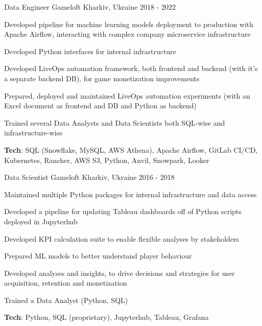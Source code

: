 \begin{cventries}
  \cventry
    {Data Engineer} %
    {Gameloft} %
    {Kharkiv, Ukraine} %
    {2018 - 2022} %
    {
      \begin{cvitems} %
        \item {Developed pipeline for machine learning models deployment to production with Apache Airflow, interacting with complex company microservice infrastructure}
        \item {Developed Python interfaces for internal infrastructure}
        \item {Developed LiveOps automation framework, both frontend and backend (with it's a separate backend DB), for game monetization improvements}
        \item {Prepared, deployed and maintained LiveOps automation experiments (with an Excel document as frontend and DB and Python as backend)}
        \item {Trained several Data Analysts and Data Scientists both SQL-wise and infrastructure-wise}
        \item {{\color{awesome-skyblue} \bf Tech}: SQL (Snowflake, MySQL, AWS Athena), Apache Airflow, GitLab CI/CD, Kubernetes, Rancher, AWS S3, Python, Anvil, Snowpark, Looker}
      \end{cvitems}
    }


  \cventry
    {Data Scientist} %
    {Gameloft} %
    {Kharkiv, Ukraine} %
    {2016 - 2018} %
    {
      \begin{cvitems} %
        \item {Maintained multiple Python packages for internal infrastructure and data access}
        \item {Developed a pipeline for updating Tableau dashboards off of Python scripts deployed in Jupyterhub}
        \item {Developed KPI calculation suite to enable flexible analyses by stakeholders}
        \item {Prepared ML models to better understand player behaviour}
        \item {Developed analyses and insights, to drive decisions and strategies for user acquisition, retention and monetization}
        \item {Trained a Data Analyst (Python, SQL)}
        \item {{\color{awesome-skyblue} \bf Tech}: Python, SQL (proprietary), Jupyterhub, Tableau, Grafana}
      \end{cvitems}
    }


\end{cventries}
